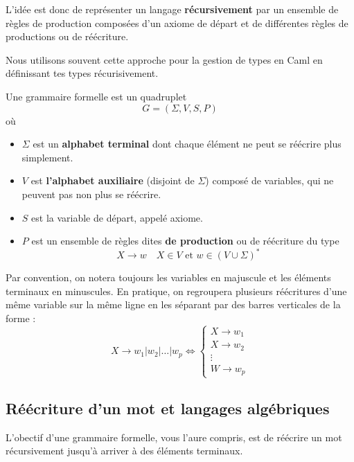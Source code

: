 \vspace{0.3cm}

L'idée est donc de représenter un langage \textbf{récursivement} par un ensemble de règles de production composées 
d'un axiome de départ et de différentes règles de productions ou de réécriture. 

Nous utilisons souvent cette approche pour la gestion de types en Caml en définissant tes types récurisivement. 


\begin{definition}
    Une grammaire formelle est un quadruplet 
        \[ G = (\Sigma, V, S, P) \] 
    où 
    \begin{itemize}
        \item $\Sigma$ est un \textbf{alphabet terminal} dont chaque élément ne peut se réécrire plus simplement. 
        \item $V$ est \textbf{l'alphabet auxiliaire} (disjoint de $\Sigma$) composé de variables, qui ne 
        peuvent pas non plus se réécrire. 
        \item $S$ est la variable de départ, appelé axiome. 
        \item $P$ est un ensemble de règles dites \textbf{de production} ou de réécriture du type 
            \[ X \longrightarrow w \quad X \in V \text{ et } w \in \left( V \cup \Sigma \right)^* \] 
    \end{itemize}
\end{definition}

Par convention, on notera toujours les variables en majuscule et les éléments terminaux en minuscules. 
En pratique, on regroupera plusieurs réécritures d'une même variable sur la même ligne en les séparant par 
des barres verticales de la forme :
    \[ X \longrightarrow w_1 | w_2 | \dots | w_p \iff 
        \begin{cases}
            X \longrightarrow w_1 \\ 
            X \longrightarrow w_2 \\ 
            \vdots \\ 
            W \longrightarrow w_p 
        \end{cases}
    \] 


\subsection{Réécriture d'un mot et langages algébriques}

L'obectif d'une grammaire formelle, vous l'aure compris, est de réécrire un mot récursivement jusqu'à arriver à des 
éléments terminaux. 


